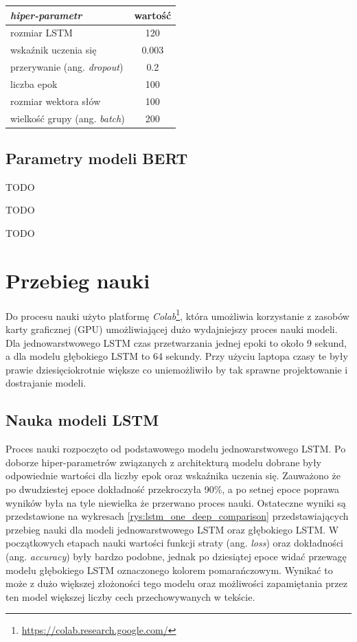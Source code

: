 \begin{table}[t]
\label{tab:parametry_lstm}
\centering\footnotesize%
\begin{tabular}{l c}
\toprule
\textit{hiper-parametr} & wartość \\
\midrule
rozmiar LSTM   & 120 \\
wskaźnik uczenia się   & 0.003 \\
przerywanie (ang. \textit{dropout})   & 0.2 \\
liczba epok   & 100 \\
rozmiar wektora słów   & 100 \\
wielkość grupy (ang. \textit{batch}) & 200 \\
\bottomrule
\end{tabular}
\end{table}

\subsection{Parametry modeli BERT}

TODO

TODO

TODO

\section{Przebieg nauki}

Do procesu nauki użyto platformę \textit{Colab}\footnote{\url{https://colab.research.google.com/}}, która umożliwia korzystanie z zasobów karty graficznej (GPU) umożliwiającej dużo wydajniejszy proces nauki modeli. Dla jednowarstwowego LSTM czas przetwarzania jednej epoki to około 9 sekund, a dla modelu głębokiego LSTM to 64 sekundy. Przy użyciu laptopa czasy te były prawie dziesięciokrotnie większe co uniemożliwiło by tak sprawne projektowanie i dostrajanie modeli.

\subsection{Nauka modeli LSTM}

Proces nauki rozpoczęto od podstawowego modelu jednowarstwowego LSTM. Po doborze hiper-parametrów związanych z architekturą modelu dobrane były odpowiednie wartości dla liczby epok oraz wskaźnika uczenia się. Zauważono że po dwudziestej epoce dokładność przekroczyła 90\%, a po setnej epoce poprawa wyników była na tyle niewielka że przerwano proces nauki. Ostateczne wyniki są przedstawione na wykresach \ref{rys:lstm_one_deep_comparison} przedstawiających przebieg nauki dla modeli jednowarstwowego LSTM oraz głębokiego LSTM. W początkowych etapach nauki wartości funkcji straty (ang. \textit{loss}) oraz dokładności (ang. \textit{accuracy}) były bardzo podobne, jednak po dziesiątej epoce widać przewagę modelu głębokiego LSTM oznaczonego kolorem pomarańczowym. Wynikać to może z dużo większej złożoności tego modelu oraz możliwości zapamiętania przez ten model większej liczby cech przechowywanych w tekście.

